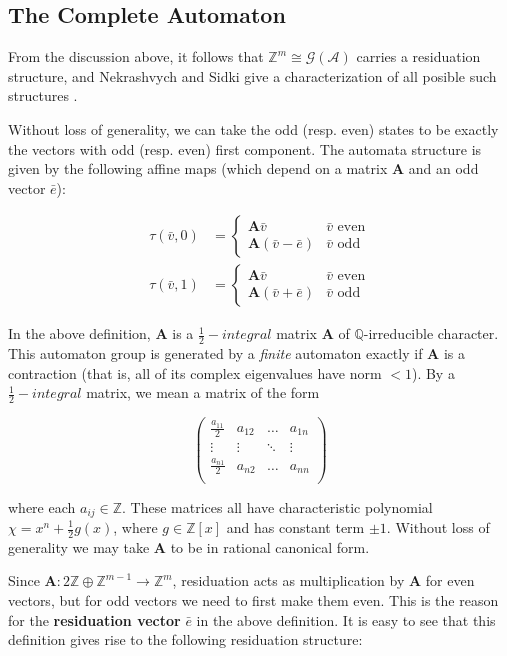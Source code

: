 \documentclass[runningheads]{llncs}
\newcommand{\A}{\mathcal{A}}
\newcommand{\G}{\mathcal{G}}
\newcommand{\Z}{\mathbb{Z}}
\newcommand{\Q}{\mathbb{Q}}
\newcommand{\2}{\textbf{2}}
\newcommand{\Am}{\textbf{A}}
\newcommand{\vv}{\bar{v}}
\newcommand{\e}{\bar{e}}
\begin{document}
\subsection{The Complete Automaton}

From the discussion above, it follows that $\Z^m \cong \G(\A)$ carries a
residuation structure, and Nekrashvych and Sidki give a characterization of
all posible such structures \cite{NekrashevychSidki04:automorphisms}.

Without loss of generality, we can take the odd (resp. even) states to be 
exactly the vectors with odd (resp. even) first component. The automata 
structure is given by the following affine maps
(which depend on a matrix $\Am$ and an odd vector $\e$):

\begin{align}
  \tau(\vv, 0) &= 
  \begin{cases} 
    \Am \vv        & \vv \text{ even}\\
    \Am (\vv - \e) & \vv \text{ odd}
  \end{cases}
  \label{eq:1}\\
  \tau(\vv, 1) &=
  \begin{cases} 
    \Am \vv        & \vv \text{ even}\\
    \Am (\vv + \e) & \vv \text{ odd}
  \end{cases}
  \label{eq:2}
\end{align}

In the above definition, $\Am$ is a $\frac{1}{2}-integral$ matrix $\Am$ of 
$\Q$-irreducible character. This automaton group is generated by a 
\emph{finite} automaton exactly if $\Am$ is a contraction (that is, all of 
its complex eigenvalues have norm $<1$). By a $\frac{1}{2}-integral$ matrix, 
we mean a matrix of the form

\[
\begin{pmatrix}
  \frac{a_{11}}{2} & a_{12} & \dots  & a_{1n}\\
  \vdots           & \vdots & \ddots & \vdots\\
  \frac{a_{n1}}{2} & a_{n2} & \dots  & a_{nn}\\
\end{pmatrix}
\]

where each $a_{ij} \in \Z$. These matrices all have characteristic polynomial
$\chi = x^n + \frac{1}{2}g(x)$, where $g \in \Z[x]$ and has constant term 
$\pm 1$. Without loss of generality we may take $\Am$ to be in rational 
canonical form.

Since $\Am : 2\Z \oplus \Z^{m-1} \to \Z^m$,
residuation acts as multiplication by $\Am$ for even vectors,
but for odd vectors we need to first make them even. This is the reason
for the \textbf{residuation vector} $\e$ in the above definition. It is easy 
to see that this definition gives rise to the following residuation structure:
\end{document}

